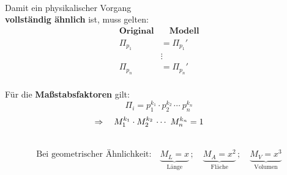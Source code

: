 \centering
\section*{}

\small

\\ \vspace{3mm}
\begin{minipage}{0.5\textwidth-30mm}
    \centering
    Damit ein physikalischer Vorgang\\ \textbf{vollständig ähnlich} ist, muss gelten:
    \begin{align*}
        \textbf{Original} &\quad\textbf{Modell} \\
              \Pi_{p_1}   &= \Pi_{p_1}'         \\
                          &\vdots               \\
              \Pi_{p_n}   &= \Pi_{p_n}'         \\
    \end{align*}
\end{minipage}%
\begin{minipage}{0.5\textwidth-30mm}
    \centering
    Für die \textbf{Maßstabsfaktoren} gilt:
    \begin{equation*}
        \Pi_i = p_1^{k_1} \cdot p_2^{k_2}\,\cdots~p_n^{k_n}
    \end{equation*}
    \begin{equation*}
        \Rightarrow \quad M_1^{k_1} \cdot M_2^{k_2}\,\cdots~M_n^{k_n} = 1 \hspace{8mm}
    \end{equation*}
    \vspace{12mm}
\end{minipage}
\vspace{6mm}

\\ \vspace{-2mm}
\begin{equation*}
    \text{Bei geometrischer Ähnlichkeit:}\quad\underbrace{M_L = x}_\text{Länge}\,;\quad\underbrace{M_A = x^2}_\text{Fläche}\,;\quad\underbrace{M_V = x^3}_\text{Volumen}
\end{equation*}